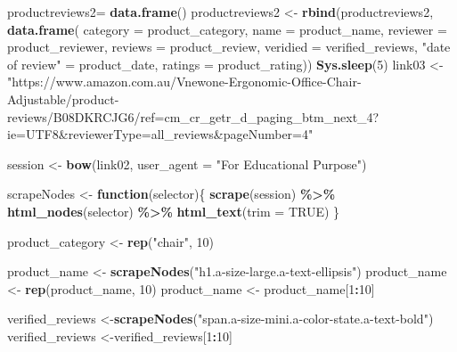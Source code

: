 \documentclass[
]{article}
\newenvironment{Shaded}{\begin{snugshade}}{\end{snugshade}}
\newcommand{\AttributeTok}[1]{\textcolor[rgb]{0.13,0.29,0.53}{#1}}
\newcommand{\ConstantTok}[1]{\textcolor[rgb]{0.56,0.35,0.01}{#1}}
\newcommand{\ControlFlowTok}[1]{\textcolor[rgb]{0.13,0.29,0.53}{\textbf{#1}}}
\newcommand{\DecValTok}[1]{\textcolor[rgb]{0.00,0.00,0.81}{#1}}
\newcommand{\FunctionTok}[1]{\textcolor[rgb]{0.13,0.29,0.53}{\textbf{#1}}}
\newcommand{\NormalTok}[1]{#1}
\newcommand{\OtherTok}[1]{\textcolor[rgb]{0.56,0.35,0.01}{#1}}
\newcommand{\SpecialCharTok}[1]{\textcolor[rgb]{0.81,0.36,0.00}{\textbf{#1}}}
\newcommand{\StringTok}[1]{\textcolor[rgb]{0.31,0.60,0.02}{#1}}
\begin{document}
\begin{Shaded}
\begin{Highlighting}[]
\NormalTok{  productreviews2}\OtherTok{=} \FunctionTok{data.frame}\NormalTok{()}
\NormalTok{  productreviews2 }\OtherTok{\textless{}{-}} \FunctionTok{rbind}\NormalTok{(productreviews2, }\FunctionTok{data.frame}\NormalTok{(}
                      \AttributeTok{category =}\NormalTok{ product\_category,}
                      \AttributeTok{name =}\NormalTok{ product\_name,}
                      \AttributeTok{reviewer =}\NormalTok{ product\_reviewer,}
                      \AttributeTok{reviews =}\NormalTok{ product\_review,}
                      \AttributeTok{veridied =}\NormalTok{ verified\_reviews,}
                      \StringTok{"date of review"} \OtherTok{=}\NormalTok{ product\_date,}
                      \AttributeTok{ratings =}\NormalTok{ product\_rating))}
 \FunctionTok{Sys.sleep}\NormalTok{(}\DecValTok{5}\NormalTok{) }
\NormalTok{link03 }\OtherTok{\textless{}{-}} \StringTok{"https://www.amazon.com.au/Vnewone{-}Ergonomic{-}Office{-}Chair{-}Adjustable/product{-}reviews/B08DKRCJG6/ref=cm\_cr\_getr\_d\_paging\_btm\_next\_4?ie=UTF8\&reviewerType=all\_reviews\&pageNumber=4"}


\NormalTok{  session }\OtherTok{\textless{}{-}} \FunctionTok{bow}\NormalTok{(link02,}
               \AttributeTok{user\_agent =} \StringTok{"For Educational Purpose"}\NormalTok{)}

\NormalTok{  scrapeNodes }\OtherTok{\textless{}{-}} \ControlFlowTok{function}\NormalTok{(selector)\{}
    \FunctionTok{scrape}\NormalTok{(session) }\SpecialCharTok{\%\textgreater{}\%}
      \FunctionTok{html\_nodes}\NormalTok{(selector) }\SpecialCharTok{\%\textgreater{}\%}
      \FunctionTok{html\_text}\NormalTok{(}\AttributeTok{trim =} \ConstantTok{TRUE}\NormalTok{)}
\NormalTok{  \}}

\NormalTok{  product\_category }\OtherTok{\textless{}{-}} \FunctionTok{rep}\NormalTok{(}\StringTok{"chair"}\NormalTok{, }\DecValTok{10}\NormalTok{)}

\NormalTok{  product\_name }\OtherTok{\textless{}{-}} \FunctionTok{scrapeNodes}\NormalTok{(}\StringTok{"h1.a{-}size{-}large.a{-}text{-}ellipsis"}\NormalTok{)}
\NormalTok{  product\_name }\OtherTok{\textless{}{-}} \FunctionTok{rep}\NormalTok{(product\_name, }\DecValTok{10}\NormalTok{)}
\NormalTok{  product\_name }\OtherTok{\textless{}{-}}\NormalTok{ product\_name[}\DecValTok{1}\SpecialCharTok{:}\DecValTok{10}\NormalTok{]}
  
\NormalTok{  verified\_reviews }\OtherTok{\textless{}{-}}\FunctionTok{scrapeNodes}\NormalTok{(}\StringTok{"span.a{-}size{-}mini.a{-}color{-}state.a{-}text{-}bold"}\NormalTok{)}
\NormalTok{  verified\_reviews }\OtherTok{\textless{}{-}}\NormalTok{verified\_reviews[}\DecValTok{1}\SpecialCharTok{:}\DecValTok{10}\NormalTok{]}
  

\end{Highlighting}
\end{Shaded}
\end{document}
